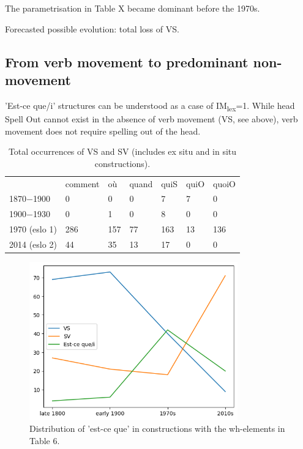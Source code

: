 \documentclass[fleqn,10pt]{wlscirep}
\begin{document}
\noindent The parametrisation in Table X became dominant before the 1970s.

\noindent Forecasted possible evolution: total loss of VS.


\subsection*{From verb movement to predominant non-movement}

'Est-ce que/i' structures can be understood as a case of IM\textsubscript{lex}=1. While head Spell Out cannot exist in the absence of verb movement (VS, see above), verb movement does not require spelling out of the head.

\begin{table}[H]
    \centering
    \large
        \begin{tabular}{l|l|l|l|l|l|l}
        \hline
        {} & comment & où & quand & quiS & quiO & quoiO \\
        1870$-$1900 & 0 & 0 & 0 & 7 & 7 & 0 \\
        1900$-$1930 & 0 & 1 & 0 & 8 & 0 & 0 \\
        1970 (eslo 1) & 286 & 157 & 77 & 163 & 13 & 136 \\
        2014 (eslo 2) & 44 & 35 & 13 & 17 & 0 & 0 \\
        \hline
        \end{tabular}
\caption{\label{tab:samp8}Total occurrences of VS and SV (includes ex situ and in situ constructions).}
\end{table}

\begin{figure}[H]
    \centering
    \includegraphics[width=90mm]{images/estceque.png} %
    \caption{Distribution of 'est-ce que' in constructions with the wh-elements in Table 6.}
    \label{fig:boat4}
  \end{figure}
\end{document}
